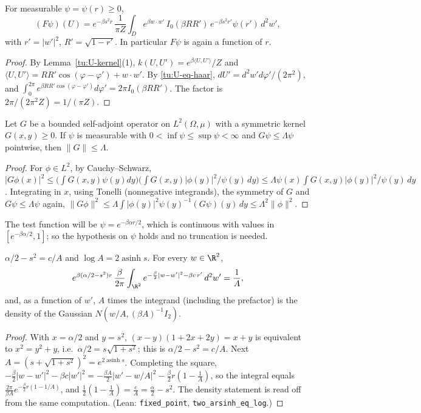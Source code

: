 \begin{lemma}\label{tu:U-Frad}
For measurable $\psi=\psi(r)\ge0$,
\[
(F\psi)(U)=e^{-\beta s^2r}\,\frac{1}{\pi Z}\int_De^{\beta w\cdot w'}\,I_0(\beta RR')\,e^{-\beta s^2r'}\psi(r')\,d^2w',
\]
with $r'=|w'|^2$, $R'=\sqrt{1-r'}$. In particular $F\psi$ is again a function of $r$.
\end{lemma}

\begin{proof}
By Lemma~\ref{tu:U-kernel}(1), $k(U,U')=e^{\beta\langle U,U'\rangle}/Z$ and
$\langle U,U'\rangle=RR'\cos(\varphi-\varphi')+w\cdot w'$. By \eqref{tu:U-eq-haar}, $dU'=d^2w'd\varphi'/(2\pi^2)$, and
$\int_0^{2\pi}e^{\beta RR'\cos(\varphi-\varphi')}d\varphi'=2\pi I_0(\beta RR')$. The factor is $2\pi/(2\pi^2Z)=1/(\pi Z)$.
\end{proof}

\begin{lemma}\label{tu:U-barta}
Let $G$ be a bounded self-adjoint operator on $L^2(\Omega,\mu)$ with a symmetric kernel $G(x,y)\ge0$. If
$\psi$ is measurable with $0<\inf\psi\le\sup\psi<\infty$ and $G\psi\le\Lambda\psi$ pointwise, then $\|G\|\le\Lambda$.
\end{lemma}

\begin{proof}
For $\phi\in L^2$, by Cauchy--Schwarz,
$|G\phi(x)|^2\le\bigl(\int G(x,y)\psi(y)dy\bigr)\bigl(\int G(x,y)|\phi(y)|^2/\psi(y)\,dy\bigr)\le\Lambda\psi(x)\int G(x,y)|\phi(y)|^2/\psi(y)\,dy$.
Integrating in $x$, using Tonelli (nonnegative integrands), the symmetry of $G$ and $G\psi\le\Lambda\psi$ again,
$\|G\phi\|^2\le\Lambda\int|\phi(y)|^2\psi(y)^{-1}(G\psi)(y)\,dy\le\Lambda^2\|\phi\|^2$.
\end{proof}

The test function will be $\psi=e^{-\beta\alpha r/2}$, which is continuous with values in
$[e^{-\beta\alpha/2},1]$; so the hypothesis on $\psi$ holds and no truncation is needed.

\begin{lemma}\label{tu:U-fixed}
$\alpha/2-s^2=c/A$ and $\log A=2\operatorname{asinh}s$. For every $w\in\R^2$,
\[
e^{\beta(\alpha/2-s^2)r}\,\frac{\beta}{2\pi}\int_{\R^2}e^{-\frac\beta2|w-w'|^2-\beta c\,r'}\,d^2w'=\frac1A ,
\]
and, as a function of $w'$, $A$ times the integrand (including the prefactor) is the density of the Gaussian
$N(w/A,(\beta A)^{-1}I_2)$.
\end{lemma}

\begin{proof}
With $x=\alpha/2$ and $y=s^2$, $(x-y)(1+2x+2y)=x+y$ is equivalent to $x^2=y^2+y$, i.e.\ $\alpha/2=s\sqrt{1+s^2}$; this is
$\alpha/2-s^2=c/A$. Next $A=(s+\sqrt{1+s^2})^2=e^{2\operatorname{asinh}s}$. Completing the square,
$-\frac\beta2|w-w'|^2-\beta c|w'|^2=-\frac{\beta A}2|w'-w/A|^2-\frac\beta2 r(1-\frac1A)$, so the integral equals
$\frac{2\pi}{\beta A}e^{-\frac\beta2r(1-1/A)}$, and $\frac12(1-\frac1A)=\frac cA=\frac\alpha2-s^2$. The density
statement is read off from the same computation. (Lean: \texttt{fixed\_point}, \texttt{two\_arsinh\_eq\_log}.)
\end{proof}


